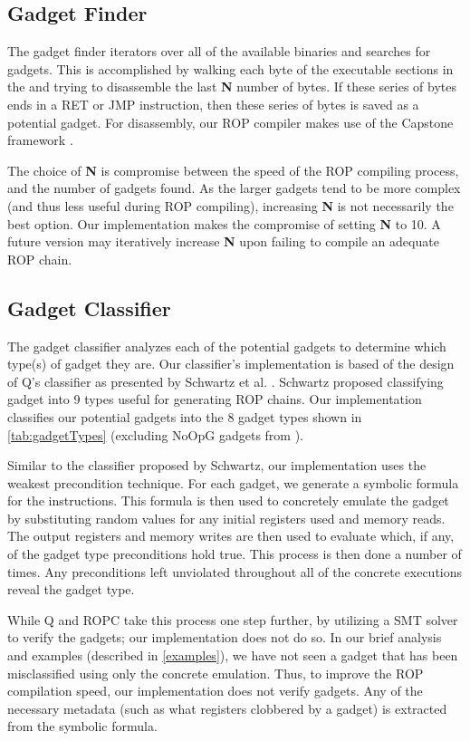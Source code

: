 \documentclass[journal]{IEEEtran}
\begin{document}
\subsection{Gadget Finder}
The gadget finder iterators over all of the available binaries and searches for gadgets.
This is accomplished by walking each byte of the executable sections in the and trying to disassemble the last \textbf{N} number of bytes.
If these series of bytes ends in a RET or JMP instruction, then these series of bytes is saved as a potential gadget.
For disassembly, our ROP compiler makes use of the Capstone framework \cite{capstone}.

The choice of \textbf{N} is compromise between the speed of the ROP compiling process, and the number of gadgets found.
As the larger gadgets tend to be more complex (and thus less useful during ROP compiling), increasing \textbf{N} is not necessarily the best option.
Our implementation makes the compromise of setting \textbf{N} to 10.
A future version may iteratively increase \textbf{N} upon failing to compile an adequate ROP chain.

\subsection{Gadget Classifier}
The gadget classifier analyzes each of the potential gadgets to determine which type(s) of gadget they are.
Our classifier's implementation is based of the design of Q's classifier as presented by Schwartz et al. \cite{schwartz2011q}.
Schwartz proposed classifying gadget into 9 types useful for generating ROP chains.
Our implementation classifies our potential gadgets into the 8 gadget types shown in \ref{tab:gadgetTypes} (excluding NoOpG gadgets from \cite{schwartz2011q}).

Similar to the classifier proposed by Schwartz, our implementation uses the weakest precondition technique.
For each gadget, we generate a symbolic formula for the instructions.
This formula is then used to concretely emulate the gadget by substituting random values for any initial registers used and memory reads.
The output registers and memory writes are then used to evaluate which, if any, of the gadget type preconditions hold true.
This process is then done a number of times.
Any preconditions left unviolated throughout all of the concrete executions reveal the gadget type.

While Q \cite{schwartz2011q} and ROPC \cite{ropc} take this process one step further, by utilizing a SMT solver to verify the gadgets; our implementation does not do so.
In our brief analysis and examples (described in \ref{examples}), we have not seen a gadget that has been misclassified using only the concrete emulation.
Thus, to improve the ROP compilation speed, our implementation does not verify gadgets.
Any of the necessary metadata (such as what registers clobbered by a gadget) is extracted from the symbolic formula.
\end{document}
